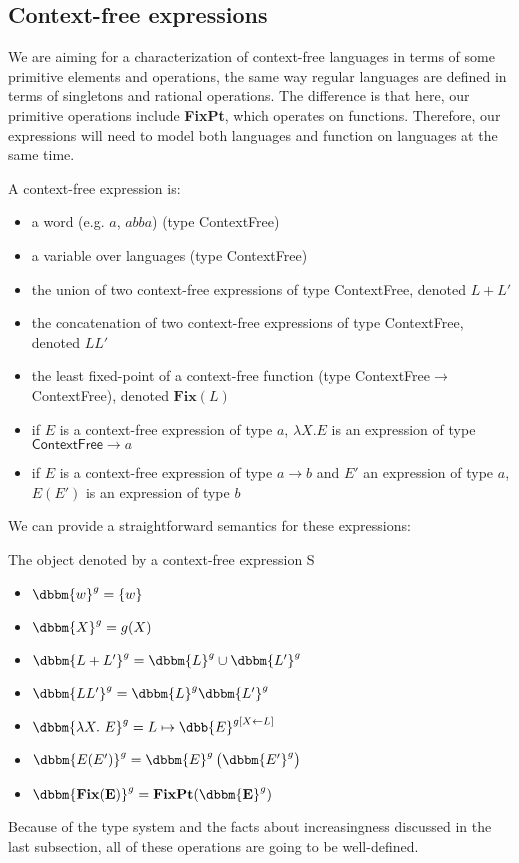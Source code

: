 \subsection{Context-free expressions}

We are aiming for a characterization of context-free languages in terms of some primitive elements and operations, the same way regular languages are defined in terms of singletons and rational operations. The difference is that here, our primitive operations include \textbf{FixPt}, which operates on functions. Therefore, our expressions will need to model both languages and function on languages at the same time.

\begin{definition}
A context-free expression is:
\begin{itemize}
\item a word (e.g. $a$, $abba$) (type \textsf{ContextFree})
\item a variable over languages (type \textsf{ContextFree})
\item the union of two context-free expressions of type \textsf{ContextFree},  denoted $L + L'$
\item the concatenation of two context-free expressions of type \textsf{ContextFree}, denoted $LL'$
\item the least fixed-point of a context-free function (type \textsf{ContextFree}$\rightarrow$\textsf{ContextFree}), denoted $\mathbf{Fix}(L)$
\item if $E$ is a context-free expression of type $a$, $\lambda X. E$ is an expression of type $\textsf{ContextFree}\rightarrow a$
\item if $E$ is a context-free expression of type $a\rightarrow b$ and $E'$ an expression of type $a$, $E(E')$ is an expression of type $b$
\end{itemize}
\end{definition}

We can provide a straightforward semantics for these expressions:

\begin{definition}
The object denoted by a context-free expression S
\begin{itemize}
\item $\dbbm{w}^{g} = \left\lbrace w\right\rbrace$
\item $\dbbm{X}^{g} = g(X)$
\item $\dbbm{L + L'}^{g} = \dbbm{L}^{g} \cup\dbbm{L'}^{g} $
\item $\dbbm{LL'}^{g} = \dbbm{L}^{g} \dbbm{L'}^{g} $
\item $\dbbm{\lambda X.\ E}^{g} = L\mapsto \dbb{E}^{g[X\leftarrow L]} $
\item $\dbbm{E(E')}^{g} = \dbbm{E}^{g}\left( \dbbm{E'}^{g}\right) $
\item $\dbbm{\mathbf{Fix(E)}}^{g} = \mathbf{FixPt}(\dbbm{\mathbf{E}}^{g}) $
\end{itemize}
\end{definition}
%
Because of the type system and the facts about increasingness discussed in the last subsection, all of these operations are going to be well-defined.

